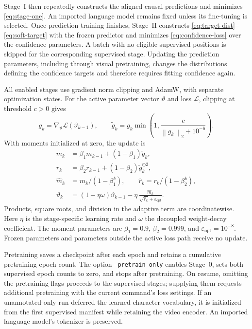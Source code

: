 \documentclass[11pt,a4paper]{article}
\newcommand{\eps}{\varepsilon}
\newcommand{\norm}[1]{\left\lVert #1\right\rVert}
\numberwithin{equation}{section}
\begin{document}
Stage~I then repeatedly constructs the aligned causal predictions and
minimizes \eqref{eq:stage-one}. An imported language model remains
fixed unless its fine-tuning is selected. Once prediction training
finishes, Stage~II constructs \eqref{eq:target-dist}--\eqref{eq:soft-target}
with the frozen predictor and minimizes \eqref{eq:confidence-loss} over
the confidence parameters. A batch with no eligible supervised
positions is skipped for the corresponding supervised stage. Updating
the prediction parameters, including through visual pretraining,
changes the distributions defining the confidence targets and therefore
requires fitting confidence again.

All enabled stages use gradient norm clipping and AdamW, with separate
optimization states. For the active parameter vector $\vartheta$ and
loss $\mathcal L$, clipping at threshold $c>0$ gives
\begin{equation}
g_k=\nabla_{\vartheta}\mathcal L(\vartheta_{k-1}),\qquad
\widetilde g_k=g_k\min\!\left(1,\frac{c}{\norm{g_k}_2+10^{-6}}\right).
\end{equation}
With moments initialized at zero, the update is
\begin{align}
m_k&=\beta_1m_{k-1}+(1-\beta_1)\widetilde g_k,\\
r_k&=\beta_2r_{k-1}+(1-\beta_2)\widetilde g_k^{\odot2},\\
\widehat m_k&=m_k/(1-\beta_1^k),\qquad
\widehat r_k=r_k/(1-\beta_2^k),\\
\vartheta_k
 &=(1-\eta\omega)\vartheta_{k-1}
   -\eta\,\frac{\widehat m_k}{\sqrt{\widehat r_k}+\eps_{\mathrm{opt}}}.
\end{align}
Products, square roots, and division in the adaptive term are
coordinatewise. Here $\eta$ is the stage-specific learning rate and
$\omega$ the decoupled weight-decay coefficient. The moment parameters
are $\beta_1=0.9$, $\beta_2=0.999$, and $\eps_{\mathrm{opt}}=10^{-8}$.
Frozen parameters and parameters outside the active loss path receive
no update.

Pretraining saves a checkpoint after each epoch and retains a cumulative
pretraining epoch count. The option \texttt{--pretrain-only} enables
Stage~0, sets both supervised epoch counts to zero, and stops after
pretraining. On resume, omitting the pretraining flags proceeds to the
supervised stages; supplying them requests additional pretraining with
the current command's loss settings. If an unannotated-only run deferred
the learned character vocabulary, it is initialized from the first
supervised manifest while retaining the video encoder. An imported
language model's tokenizer is preserved.
\end{document}
